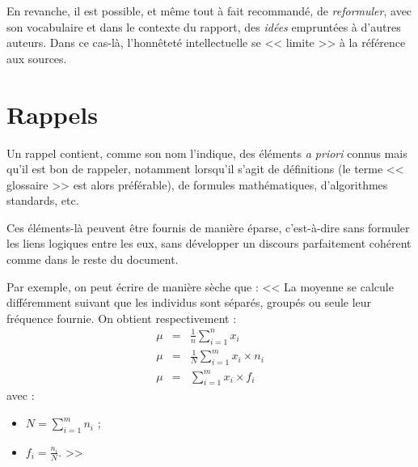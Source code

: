 \documentclass[11pt, french]{report-rd-info}
\begin{document}
En revanche, il est possible, et même tout à fait recommandé, de \emph{reformuler}, avec son vocabulaire et dans le contexte du rapport, des \emph{idées} empruntées à d'autres auteurs. Dans ce cas-là, l'honnêteté intellectuelle se << limite >> à la référence aux sources.

\bigskip

\begin{center}
\end{center}

\chapter{Rappels}
\label{ann:Rappels}

Un rappel contient, comme son nom l'indique, des éléments \emph{a priori} connus mais qu'il est bon de rappeler, notamment lorsqu'il s'agit de définitions (le terme << glossaire >> est alors préférable), de formules mathématiques, d'algorithmes standards, etc.

Ces éléments-là peuvent être fournis de manière éparse, c'est-à-dire sans formuler les liens logiques entre les eux, sans développer un discours parfaitement cohérent comme dans le reste du document.

Par exemple, on peut écrire de manière sèche que : << La moyenne se calcule différemment suivant que les individus sont séparés, groupés ou seule leur fréquence fournie. On obtient respectivement :
\begin{eqnarray}
    \mu & = & \frac{1}{n} \sum_{i=1}^n x_i\\
    \mu & = & \frac{1}{N} \sum_{i=1}^m x_i \times n_i\\
    \mu & = & \sum_{i=1}^m x_i \times f_i
\end{eqnarray}
avec :
\begin{itemize}
    \item $N = \sum_{i=1}^m n_i$ ;
    \item $f_i = \frac{n_i}{N}$. >>
\end{itemize}
\end{document}

